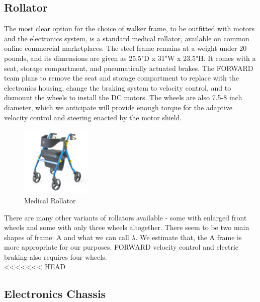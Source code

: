 \subsection{Rollator}
\noindent The most clear option for the choice of walker frame, to be outfitted with motors and the electronics system, is a standard medical rollator, available on common online commercial marketplaces. The steel frame remains at a weight under 20 pounds, and its dimensions are given as 25.5"D x 31"W x 23.5"H. It comes with a seat, storage compartment, and pneumatically actuated brakes. The FORWARD team plans to remove the seat and storage compartment to replace with the electronics housing, change the braking system to velocity control, and to dismount the wheels to install the DC motors. The wheels are also 7.5-8 inch diameter, which we anticipate will provide enough torque for the adaptive velocity control and steering enacted by the motor shield.\\

\begin{figure}[H]
	\centering
	\includegraphics[width=0.3\textwidth]{./Images/rollator-amaz.jpg}
	\caption{\label{fig:rollator-amaz}Medical Rollator}
\end{figure}

\noindent There are many other variants of rollators available - some with enlarged front wheels and some with only three wheels altogether. There seem to be two main shapes of frame: A and what we can call $\lambda$. We estimate that, the A frame is more appropriate for our purposes. FORWARD velocity control and electric braking also requires four wheels.\\

<<<<<<< HEAD

\subsection{Electronics Chassis}
